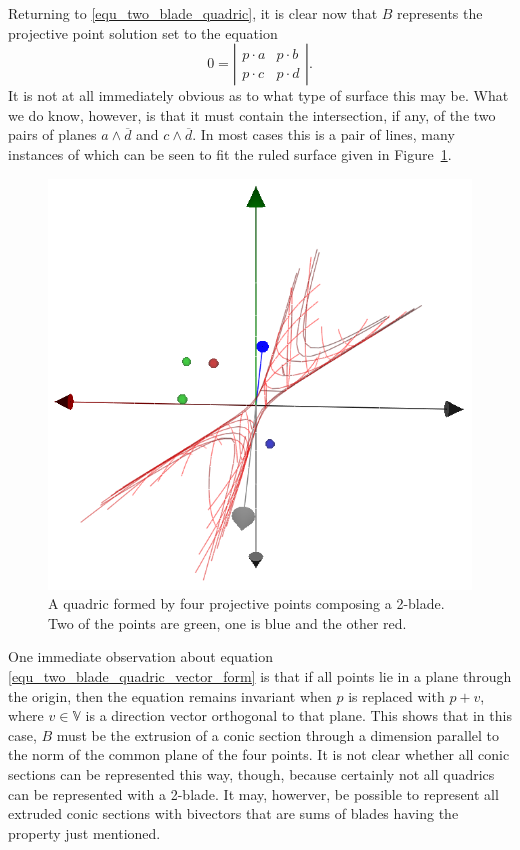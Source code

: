\documentclass{birkjour}
\theoremstyle{definition}
\theoremstyle{remark}
\numberwithin{equation}{section}
\newcommand{\V}{\mathbb{V}}
\begin{document}
Returning to \eqref{equ_two_blade_quadric}, it is clear now that $B$ represents
the projective point solution set to the equation
\begin{equation}\label{equ_two_blade_quadric_vector_form}
0 = \left|\begin{array}{cc} p\cdot a & p\cdot b \\ p\cdot c & p\cdot d \end{array}\right|.
\end{equation}
It is not at all immediately obvious as to what type of surface this may be.
What we do know, however, is that it must
contain the intersection, if any, of the two pairs of planes $a\wedge\overline{d}$ and $c\wedge\overline{d}$.
In most cases this is a pair of lines, many instances of which can be seen to fit the ruled surface
given in Figure~\ref{fig_quadric_blade}.

\begin{figure}
\includegraphics[scale=0.5]{QuadricBlade}
\caption{A quadric formed by four projective points composing a 2-blade.
Two of the points are green, one is blue and the other red.}
\label{fig_quadric_blade}
\end{figure}

One immediate observation about equation \eqref{equ_two_blade_quadric_vector_form}
is that if all points lie in a plane through the origin, then the equation remains
invariant when $p$ is replaced with $p+v$, where $v\in\V$ is a direction vector
orthogonal to that plane.  This shows that in this case, $B$ must be the
extrusion of a conic section through a dimension parallel to the norm of
the common plane of the four points.  It is not clear whether all conic
sections can be represented this way, though, because certainly not
all quadrics can be represented with a 2-blade.  It may, howerver,
be possible to represent all extruded conic sections with bivectors that are sums
of blades having the property just mentioned.
\end{document}

